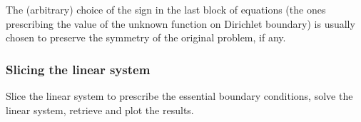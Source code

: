 \documentclass[letterpaper,10pt,english]{jupyterBook}
\begin{document}
\sphinxAtStartPar
The (arbitrary) choice of the sign in the last block of equations (the ones prescribing the value of the unknown function on Dirichlet boundary) is usually chosen to preserve the symmetry of the original problem, if any.

\sphinxAtStartPar
{} 


\subsubsection{Slicing the linear system}
\label{\detokenize{ch/pde/fvm-poisson-1d:slicing-the-linear-system}}
\sphinxAtStartPar
Slice the linear system to prescribe the essential boundary conditions, solve the linear system, retrieve and plot the results.
\end{document}
